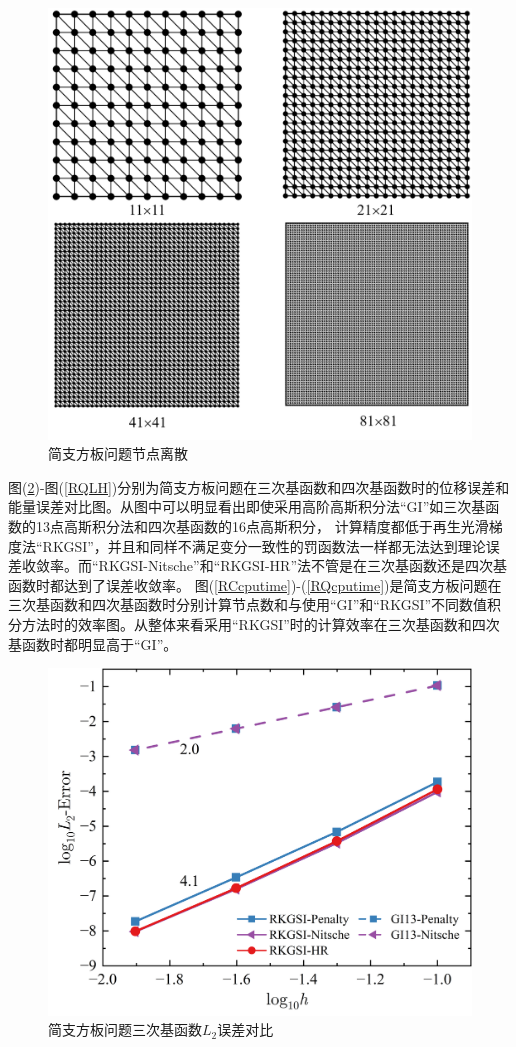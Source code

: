 \begin{figure}[H]
\centering
      \includegraphics[scale=0.4]{figure/PHR/R/rectangularmsh.png}
    \caption{简支方板问题节点离散}\label{rectangularmsh}
\end{figure}
\newpage
 图(\ref{RCLH})-图(\ref{RQLH})分别为简支方板问题在三次基函数和四次基函数时的位移误差和能量误差对比图。从图中可以明显看出即使采用高阶高斯积分法“GI”如三次基函数的13点高斯积分法和四次基函数的16点高斯积分，
计算精度都低于再生光滑梯度法“RKGSI”，并且和同样不满足变分一致性的罚函数法一样都无法达到理论误差收敛率。而“RKGSI-Nitsche”和“RKGSI-HR”法不管是在三次基函数还是四次基函数时都达到了误差收敛率。
图(\ref{RCcputime})-(\ref{RQcputime})是简支方板问题在三次基函数和四次基函数时分别计算节点数和与使用“GI”和“RKGSI”不同数值积分方法时的效率图。从整体来看采用“RKGSI”时的计算效率在三次基函数和四次基函数时都明显高于“GI”。  
\begin{figure}[H]
    \centering
    \includegraphics[scale=0.5]{figure/PHR/R/CL2.png}
    \caption{简支方板问题三次基函数$L_2$误差对比}\label{RCLH}
\end{figure}
